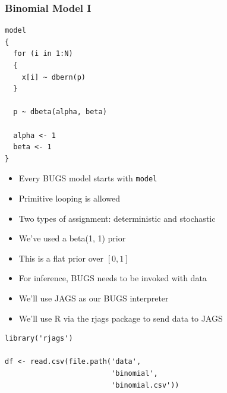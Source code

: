 \documentclass{beamer}
\begin{document}
\begin{frame}[fragile]
  \frametitle{Binomial Model I}

  \begin{verbatim}
model
{
  for (i in 1:N)
  {
    x[i] ~ dbern(p)
  }
  
  p ~ dbeta(alpha, beta)
  
  alpha <- 1
  beta <- 1
}
  \end{verbatim}
\end{frame}

\begin{frame}[fragile]
  \begin{itemize}
    \item{Every BUGS model starts with \verb|model|}
    \item{Primitive looping is allowed}
    \item{Two types of assignment: deterministic and stochastic}
  \end{itemize}
\end{frame}

\begin{frame}[fragile]
  \begin{itemize}
    \item{We've used a beta(1, 1) prior}
    \item{This is a flat prior over $[0, 1]$}
  \end{itemize}
\end{frame}

\begin{frame}[fragile]
  \begin{itemize}
    \item{For inference, BUGS needs to be invoked with data}
    \item{We'll use JAGS as our BUGS interpreter}
    \item{We'll use R via the rjags package to send data to JAGS}
  \end{itemize}
\end{frame}

\begin{frame}[fragile]
  \begin{verbatim}
library('rjags')

df <- read.csv(file.path('data',
                         'binomial',
                         'binomial.csv'))
  \end{verbatim}
\end{frame}
\end{document}
